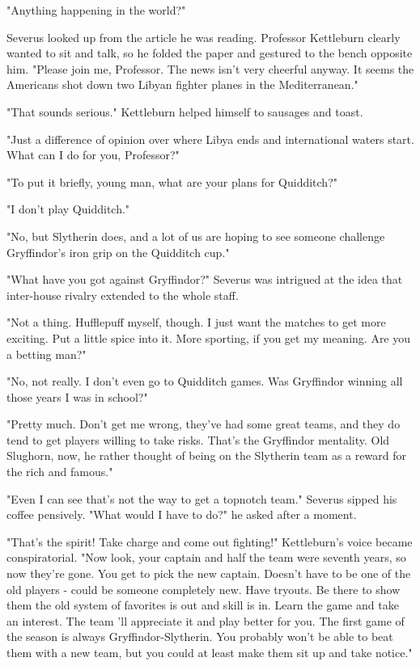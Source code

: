 "Anything happening in the world?"

Severus looked up from the article he was reading. Professor Kettleburn clearly wanted to sit and talk, so he folded the paper and gestured to the bench opposite him. "Please join me, Professor. The news isn't very cheerful anyway. It seems the Americans shot down two Libyan fighter planes in the Mediterranean."

"That sounds serious." Kettleburn helped himself to sausages and toast.

"Just a difference of opinion over where Libya ends and international waters start. What can I do for you, Professor?"

"To put it briefly, young man, what are your plans for Quidditch?"

"I don't play Quidditch."

"No, but Slytherin does, and a lot of us are hoping to see someone challenge Gryffindor's iron grip on the Quidditch cup."

"What have you got against Gryffindor?" Severus was intrigued at the idea that inter-house rivalry extended to the whole staff.

"Not a thing. Hufflepuff myself, though. I just want the matches to get more exciting. Put a little spice into it. More sporting, if you get my meaning. Are you a betting man?"

"No, not really. I don't even go to Quidditch games. Was Gryffindor winning all those years I was in school?"

"Pretty much. Don't get me wrong, they've had some great teams, and they do tend to get players willing to take risks. That's the Gryffindor mentality. Old Slughorn, now, he rather thought of being on the Slytherin team as a reward for the rich and famous."

"Even I can see that's not the way to get a topnotch team." Severus sipped his coffee pensively. "What would I have to do?" he asked after a moment.

"That's the spirit! Take charge and come out fighting!" Kettleburn's voice became conspiratorial. "Now look, your captain and half the team were seventh years, so now they're gone. You get to pick the new captain. Doesn't have to be one of the old players - could be someone completely new. Have tryouts. Be there to show them the old system of favorites is out and skill is in. Learn the game and take an interest. The team 'll appreciate it and play better for you. The first game of the season is always Gryffindor-Slytherin. You probably won't be able to beat them with a new team, but you could at least make them sit up and take notice."

